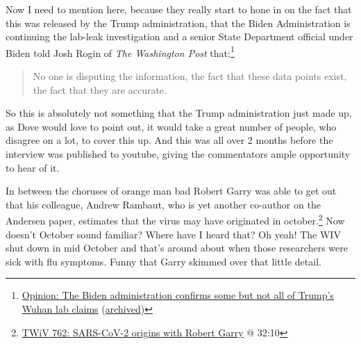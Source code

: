 \documentclass[11pt]{article}
\begin{document}
Now I need to mention here, because they really start to hone in on the fact that this was released by the Trump administration, that the Biden Administration is continuing the lab-leak investigation and a senior State Department official under Biden told Josh Rogin of \emph{The Washington Post} that:\footnote{\href{https://www.washingtonpost.com/opinions/2021/03/09/biden-administration-confirms-some-trump-wuhan-lab-claims/}{Opinion: The Biden administration confirms some but not all of Trump’s Wuhan lab claims} (\href{https://archive.ph/yw80n}{archived})}
\begin{quote}
No one is disputing the information, the fact that these data points exist, the fact that they are accurate.
\end{quote}
So this is absolutely not something that the Trump administration just made up, as Dove would love to point out, it would take a great number of people, who disagree on a lot, to cover this up. And this was all over 2 months before the interview was published to youtube, giving the commentators ample opportunity to hear of it.

In between the choruses of orange man bad Robert Garry was able to get out that his colleague, Andrew Rambaut, who is yet another co-author on the Andersen paper, estimates that the virus may have originated in october.\footnote{\href{https://youtu.be/IxwrDSYrhjU?t=1930}{TWiV 762: SARS-CoV-2 origins with Robert Garry} @ 32:10} Now doesn't October sound familiar? Where have I heard that? Oh yeah! The WIV shut down in mid October and that's around about when those researchers were sick with flu symptoms. Funny that Garry skimmed over that little detail.
\end{document}
